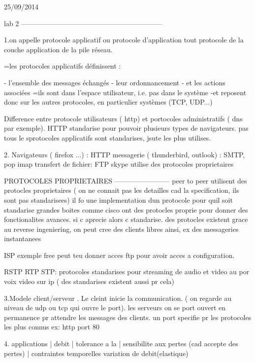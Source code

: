25/09/2014

lab 2
--------------------------------------------------------------


1.on appelle protocole applicatif ou protocole d’application tout protocole de la couche application de la pile réseau.

=les protocoles applicatifs définissent :

 - l’ensemble des messages échangés
 - leur ordonnancement
 - et les actions associées
 =ils sont dans l’espace utilisateur, i.e. pas dans le système
 -et reposent donc sur les autres protocoles, en particulier systèmes (TCP, UDP...)


 Difference entre protocole utilisateurs ( http) et portocoles administratifs ( dns par exemple).
HTTP standarise pour pouvoir plusieurs types de navigateurs.
pas tous le sprotocoles applicatifs sont standarises, jsute les plus utilises.


2. Navigateurs ( firefox ...)  : HTTP
   messagerie ( thunderbird, outlook) : SMTP, pop imap
   transfert de fichier:  FTP
   skype utilise des protocoles proprietaires

   PROTOCOLES PROPRIETAIRES
   ------------------------
   peer to peer utilisent des protocles proprietaires ( on ne connait pas les detailles cad la specification, ils sont pas standarisees)
   il fo une implementation dun protocole pour quil soit standarise
   grandes boites comme cisco ont des protocles proprie pour donner des fonctionalites avances. si c aprecie alors c standarise.
   des protocles existent grace au reverse ingeniering, on peut cree des clients libres ainsi, ex des messageries instantanees
   
   ISP exemple free peut teu donner acces ftp pour avoir acces a configuration.

   RSTP RTP STP: protocoles standarises pour streaming de audio et video au por voix video sur ip ( des standarises existent aussi pr cela)
  
3.Modele client/serveur .
Le cleint inicie la communication. ( on regarde au niveau de udp ou tcp qui ouvre le port).                                                 
les serveurs on se port ouvert en permanence pr attendre les messages des clients.
un port specifie pr les protocoles les plus connus 
ex: http port 80


4.
applications                  | debit                      |     tolerance a la                      | sensibilite            aux pertes  (cad accepte des pertes)              | contraintes temporelles
                                                                  variation de debit(elastique)



